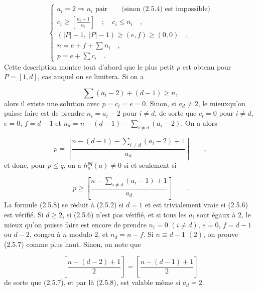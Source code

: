 
\begin{equation}\tag{2.5.5}
\left\{
\begin{array}{l}
a_i = 2 \Longrightarrow n_i \mbox{ pair} \qquad \mbox{(sinon (2.5.4) est impossible)} \\[3mm]
c_i \geq \left[ \displaystyle\frac{n_i+1}{a_i} \right] \quad ; \quad c_i \leq n_i \quad , \\[3mm]
(|P|-1, \; |P|-1) \geq (e,f) \geq (0,0) \quad , \\[3mm]
n = e+f+ \sum n_i \quad , \\[3mm]
p = e + \sum c_i \quad .
\end{array}
\right.
\end{equation}
Cette description montre tout d'abord que le plus petit $p$ est obtenu pour $P = [1,d]$, cas auquel on se limitera. Si on a

\begin{equation}\tag{2.5.6}
\sum (a_i-2) + (d-1) \geq n,
\end{equation}
alors il existe une solution avec $p = c_i = e = 0$. Sinon, si $a_d \neq 2$, le mieuxqu'on puisse faire est de prendre $n_i = a_i - 2$ pour $i \neq d$, de sorte que $c_i = 0$ pour $i \neq d$, $e = 0$, $f = d-1$ et $n_d = n - (d-1) - \sum\limits_{i \neq d} (a_i-2)$. On a alors

\begin{equation}\tag{2.5.7}
p = \left[ \displaystyle\frac{n-(d-1) - \sum\limits_{i \neq d} (a_i-2) + 1}{a_d} \right] \qquad ,
\end{equation}
et donc, pour $p \leq q$, on a $h^{pq}_{o}(\underline{a}) \neq 0$ si et seulement si

\begin{equation}\tag{2.5.8}
p \geq \left[ \displaystyle\frac{n- \sum\limits_{i \neq d} (a_i-1) + 1}{a_d} \right] \qquad .
\end{equation}
La formule (2.5.8) se réduit à (2.5.2) si $d = 1$ et est trivialement vraie si (2.5.6) est vérifié. Si $d \geq 2$, si (2.5.6) n'est pas vérifié, et si tous les $a_i$ sont égaux à $2$, le mieux qu'on puisse faire est encore de
prendre $n_i = 0$ $(i \neq d)$, $e = 0$, $f = d-1$ ou $d-2$, congru à $n$ modulo $2$, et $n_d = n-f$. Si $n \equiv d-1$ $(2)$, on prouve (2.5.7) comme plus haut. Sinon, on note que

\begin{equation*}
\left[ \displaystyle\frac{n - (d-2) + 1}{2} \right] = \left[ \displaystyle\frac{n - (d-1) + 1}{2} \right]
\end{equation*}
de sorte que (2.5.7), et par là (2.5.8), est valable même si $a_d = 2$.

